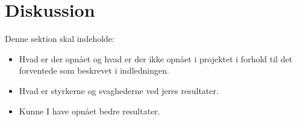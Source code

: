 \section{Diskussion}
Denne sektion skal indeholde:

\begin{itemize}
    \item Hvad er der opnået og hvad er der ikke opnået i projektet i forhold til det forventede som beskrevet i indledningen.  
    \item Hvad er styrkerne og svaghederne ved jeres resultater.
    \item Kunne I have opnået bedre resultater.
\end{itemize}{}